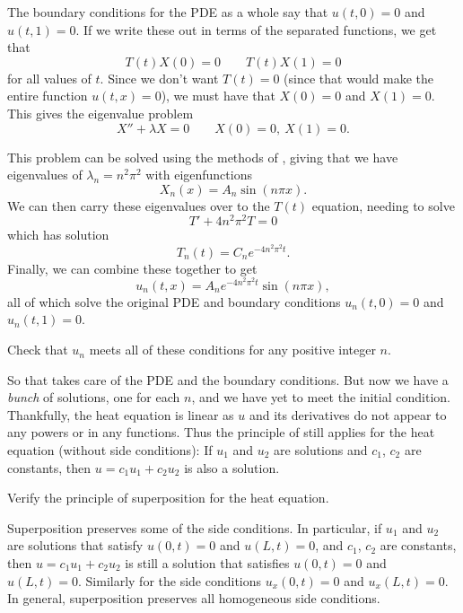 \documentclass{ximera}
\begin{document}
The boundary conditions for the PDE as a whole say that $u(t,0) = 0$ and $u(t,1) = 0$. If we write these out in terms of the separated functions, we get that
\[ 
    T(t)X(0) = 0 \qquad T(t)X(1) = 0 
\] 
for all values of $t$. Since we don't want $T(t) = 0$ (since that would make the entire function $u(t,x) = 0$), we must have that $X(0) = 0$ and $X(1) = 0$. This gives the eigenvalue problem
\[ 
    X'' + \lambda X = 0 \qquad X(0) = 0,\ X(1) = 0. 
\]

This problem can be solved using the methods of , giving that we have eigenvalues of $\lambda_n = n^2\pi^2$ with eigenfunctions 
\[
    X_n(x) = A_n \sin(n\pi x). 
\] 
We can then carry these eigenvalues over to the $T(t)$ equation, needing to solve
\[ 
    T' + 4n^2\pi^2 T = 0 
\] 
which has solution 
\[ 
    T_n(t) = C_n e^{-4n^2\pi^2 t}. 
\] 
Finally, we can combine these together to get
\[ 
    u_n(t,x) = A_n e^{-4n^2\pi^2 t}\sin(n\pi x), 
\] 
all of which solve the original PDE and boundary conditions $u_n(t, 0) = 0$ and $u_n(t,1) = 0$. 

\begin{exercise}
    Check that $u_n$ meets all of these conditions for any positive integer $n$. 
\end{exercise}

So that takes care of the PDE and the boundary conditions. But now we have a \emph{bunch} of solutions, one for each $n$, and we have yet to meet the initial condition. Thankfully, the heat equation is linear as $u$ and its derivatives do not appear to any powers or in any functions. Thus the principle of  still applies for the heat equation (without side conditions): If $u_1$ and $u_2$ are solutions and $c_1$, $c_2$ are constants, then $u = c_1 u_1 + c_2 u_2$ is also a solution.

\begin{exercise}
    Verify the principle of superposition for the heat equation.
\end{exercise}

Superposition preserves some of the side conditions.  In particular, if $u_1$ and $u_2$ are solutions that satisfy $u(0,t) = 0$ and $u(L,t) = 0$, and $c_1$, $c_2$ are constants, then $u = c_1 u_1 + c_2 u_2$ is still a solution that satisfies $u(0,t) = 0$ and $u(L,t) = 0$.  Similarly for the side conditions $u_x(0,t) = 0$ and $u_x(L,t) = 0$.  In general, superposition preserves all homogeneous side conditions.
\end{document}
